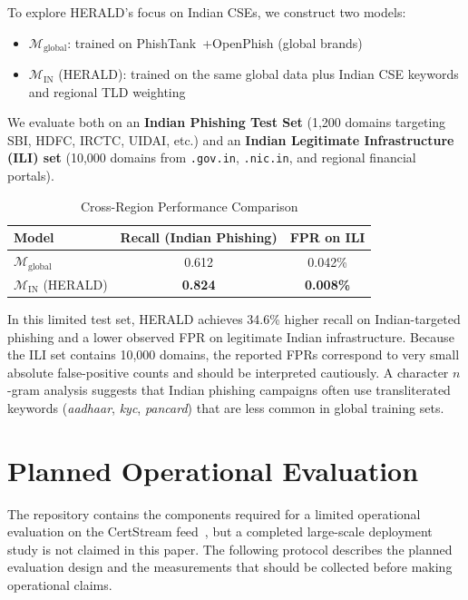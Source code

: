 \documentclass[conference]{IEEEtran}
\begin{document}
To explore HERALD's focus on Indian CSEs, we construct two models:
\begin{itemize}
    \item $\mathcal{M}_{\text{global}}$: trained on PhishTank~\cite{phishtank}+OpenPhish (global brands)
    \item $\mathcal{M}_{\text{IN}}$ (HERALD): trained on the same global data plus Indian CSE keywords and regional TLD weighting
\end{itemize}

We evaluate both on an \textbf{Indian Phishing Test Set} (1,200 domains targeting SBI, HDFC, IRCTC, UIDAI, etc.) and an \textbf{Indian Legitimate Infrastructure (ILI) set} (10,000 domains from \texttt{.gov.in}, \texttt{.nic.in}, and regional financial portals).

\begin{table}[htbp]
\centering
\small
\caption{Cross-Region Performance Comparison}
\begin{tabular}{lcc}
\toprule
\textbf{Model} & \textbf{Recall (Indian Phishing)} & \textbf{FPR on ILI} \\
\midrule
$\mathcal{M}_{\text{global}}$ & 0.612 & 0.042\% \\
$\mathcal{M}_{\text{IN}}$ (HERALD) & \textbf{0.824} & \textbf{0.008\%} \\
\bottomrule
\end{tabular}
\label{tab:regional_gain}
\end{table}

In this limited test set, HERALD achieves 34.6\% higher recall on Indian-targeted phishing and a lower observed FPR on legitimate Indian infrastructure. Because the ILI set contains 10,000 domains, the reported FPRs correspond to very small absolute false-positive counts and should be interpreted cautiously. A character $n$-gram analysis suggests that Indian phishing campaigns often use transliterated keywords (\textit{aadhaar}, \textit{kyc}, \textit{pancard}) that are less common in global training sets.

\section{Planned Operational Evaluation}
\label{sec:live}

The repository contains the components required for a limited operational evaluation on the CertStream feed~\cite{certstream}, but a completed large-scale deployment study is not claimed in this paper. The following protocol describes the planned evaluation design and the measurements that should be collected before making operational claims.
\end{document}
